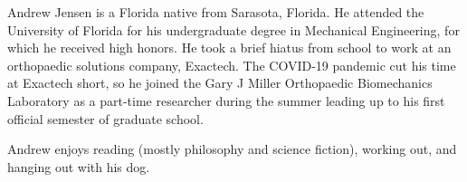 Andrew Jensen is a Florida native from Sarasota, Florida. He attended the University of Florida for his undergraduate degree in Mechanical Engineering, for which he received high honors. He took a brief hiatus from school to work at an orthopaedic solutions company, Exactech. The COVID-19 pandemic cut his time at Exactech short, so he joined the Gary J Miller Orthopaedic Biomechanics Laboratory as a part-time researcher during the summer leading up to his first official semester of graduate school.

Andrew enjoys reading (mostly philosophy and science fiction), working out, and hanging out with his dog.
